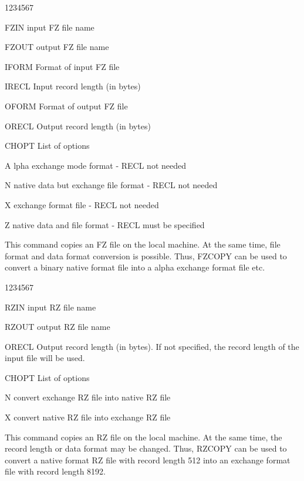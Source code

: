 \begin{DLtt}{1234567}
\item[FZIN]input  FZ file name
\item[FZOUT]output FZ file name
\item[IFORM]Format of input FZ file
\item[IRECL]Input record length (in bytes)
\item[OFORM]Format of output FZ file
\item[ORECL]Output record length (in bytes)
\item[CHOPT]List of options
\begin{DLtt}{12}
\item[A]lpha exchange mode format           - RECL not needed
\item[N]native data but exchange file format - RECL not needed
\item[X]exchange format file                 - RECL not needed
\item[Z]native data and file format          - RECL must be specified
\end{DLtt}
\end{DLtt}
This command copies an FZ file on the local machine. At
the same time, file format and data format conversion is
possible. Thus, FZCOPY can be used to convert a binary
native format file into a alpha exchange format file etc.

\begin{DLtt}{1234567}
\item[RZIN]input  RZ file name
\item[RZOUT]output RZ file name
\item[ORECL]Output record length (in bytes). If not specified, the record
length of the input file will be used.
\item[CHOPT]List of options
\begin{DLtt}{12}
\item[N]convert exchange RZ file into native RZ file
\item[X]convert native RZ file into exchange RZ file
\end{DLtt}
\end{DLtt}
This command copies an RZ file on the local machine. At
the same time, the record length or data format may be
changed. Thus, RZCOPY can be used to convert a native
format RZ file with record length 512 into an exchange
format file with record length 8192.

